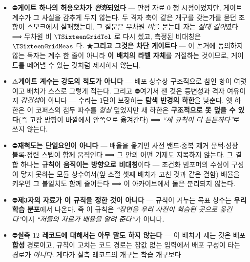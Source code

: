 \documentclass[11pt]{report}
\numberwithin{equation}{chapter}
\numberwithin{figure}{chapter}
\numberwithin{table}{chapter}
\begin{document}
\begin{itemize}
        \textbf{참값장의 비선형성과 분산관계}이고(배치 \texttt{T1}$\cdot$\texttt{T1b}
        $\cdot$\texttt{T10}), 그것은 성과에 \emph{인접한} 정보이므로 blind 의 약화를
        무해한 쪽으로 적지 않는다. ⟹ 참인 약한 진술은
        \emph{``$\TSixteenN$ 전부가 \textbf{성과}에 대해 blind''} 이지 \emph{``아무도 열지
        않은 신선한 블록''} 이 아니다. ⚠\textbf{추정기 시드도 하나}다.
  \item ⛔\textbf{게이트 하나의 허용오차가 \emph{완화}되었다} --- 판정 자료 $0$ 행
        시점이었지만, 게이트 계수가 그 사실을 감추게 두지 않는다. 두 격자 축이 같은 개구를
        갖는가를 묻던 조항이 스모크에서 실패했는데, 그 질문은 무차원 \emph{비}를 묻는데
        자는 \emph{절대 길이}였다 ⟹ 무차원 비 $\TSixteenGridTol$ 로 다시 썼고, 측정된 비대칭은
        $\TSixteenGridMeas$ 다. ★\textbf{그리고 그것은 차단 게이트다} --- 이 논거에
        동의하지 않는 독자는 계수 한 줄이 아니라 \textbf{이 배치의 라벨 자체}를 거절하는
        것이므로, 게이트를 떼어낼 수 있는 것처럼 제시하지 않는다.
  \item ⚠\textbf{게이트 계수는 강도의 척도가 아니다} --- 배포 상수상 구조적으로 참인 항이
        여럿이고 배치가 스스로 그렇게 적는다. 그리고 ⛔여기서 잰 것은 등변성과 격자
        여유이지 \emph{강건성}이 아니다 --- 수리는 $1$단이 보장하는 \textbf{탐색 반경의
        하한}을 낮춘다. 옛 하한은 이 코퍼스의 첨두 파수를 \emph{항상} 덮었지만 새 하한은
        \textbf{구조적으로 못 덮을 수 있다}(즉 고장 방향이 바깥에서 안쪽으로 옮겨간다)
        ⟹ \emph{``새 규칙이 더 튼튼하다''}로 쓰지 않는다.
  \item ⛔\textbf{재척도는 단일요인이 아니다} --- 배율을 옮기면 사전 밴드$\cdot$중복 제거
        문턱$\cdot$성장 블록$\cdot$정련 스텝이 함께 움직인다 ⟹ 그 안의 어떤 기제도
        지목하지 않는다. 그 결합 하나는 \textbf{규칙이 움직이는 방향으로 비대칭}이다 ---
        조건화 빔포머의 수심이 구성이 닿지 못하는 모듈 상수여서(앞 소절 셋째 배치가
        고친 것과 같은 결함) 배율을 키우면 그 불일치도 함께 줄어든다 ⟹ 이 아카이브에서
        둘은 분리되지 않는다.
  \item ⛔\textbf{제3자의 자료가 이 규칙을 정한 것이 아니다} --- 규칙이 겨누는 목표 상수는
        \textbf{우리 학습 분포}에서 나온다. 즉 이 규칙은 \emph{``장면을 우리 사전이 학습된
        곳으로 옮긴다''}이지 \emph{``저들의 자료가 배율을 알려 준다''}가 아니다.
  \item ⛔\textbf{실측 $12$ 레코드에 대해서는 아무 말도 하지 않는다} --- 이 배치가 재는
        것은 배포 \textbf{합성} 경로이고, 규칙이 고치는 코드 경로는 참값 없는 입력에서
        배포 구성이 타는 경로가 \emph{아니다}. 게다가 실측 레코드의 개구는 학습 개구보다

\end{itemize}
\end{document}
